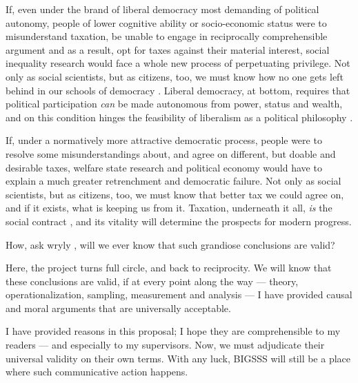 If, even under the brand of liberal democracy most demanding of political autonomy, people of lower cognitive ability or socio-economic status were to misunderstand taxation, be unable to engage in reciprocally comprehensible argument and as a result, opt for taxes against their material interest, social inequality research would face a whole new process of perpetuating privilege.
Not only as social scientists, but as citizens, too, we must know how no one gets left behind in our schools of democracy \citep{DeTocqueville1840,Rosenberg-2002-aa}.
Liberal democracy, at bottom, requires that political participation \emph{can} be made autonomous from power, status and wealth, and on this condition hinges the feasibility of liberalism as a political philosophy \citep[K1431]{GutmannThompson-2004-aa}.

If, under a normatively more attractive democratic process, people were to resolve some misunderstandings about, and agree on different, but doable and desirable taxes, welfare state research and political economy would have to explain a much greater retrenchment and democratic failure.
Not only as social scientists, but as citizens, too, we must know that better tax we could agree on, and if it exists, what is keeping us from it.
Taxation, underneath it all, \emph{is} the social contract \citep{SchumpeterSwedberg-1942-aa}, and its vitality will determine the prospects for modern progress.

How, ask wryly \citealt[2]{PrzeworskiSalomon1995}, will we ever know that such grandiose conclusions are valid?

Here, the project turns full circle, and back to reciprocity.
We will know that these conclusions are valid, if at every point along the way --- theory, operationalization, sampling, measurement and analysis --- I have provided causal and moral arguments that are universally acceptable.

I have provided reasons in this proposal; I hope they are comprehensible to my readers --- and especially to my supervisors.
Now, we must adjudicate their universal validity on their own terms.
With any luck, \gls{BIGSSS} will still be a place where such communicative action happens.

